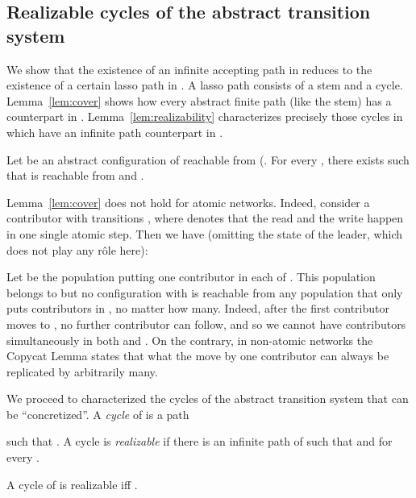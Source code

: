 \documentclass{llncs}
\begin{document}
\subsection{Realizable cycles of the abstract transition system} 
\label{subsec:realiz}
We show that the existence of an infinite accepting path in 
reduces to the existence of a certain lasso path in .  A
lasso path consists of a stem and a cycle.  
Lemma~\ref{lem:cover} shows
how every abstract finite path (like the stem) has a counterpart in .
Lemma~\ref{lem:realizability}
characterizes precisely those cycles in  which have an
infinite path counterpart in . 

\begin{lemma}
	Let  be an abstract configuration of  reachable from 
	 (.
	For every , there exists  such that
	 is reachable from 
	and .
	\label{lem:cover}
\end{lemma}
Lemma~\ref{lem:cover} does not hold for atomic networks. Indeed, consider a contributor
with transitions , where 
 denotes that the read and the write happen in one single atomic step.
Then we have (omitting the state of the leader, which does not play any r\^ole here):
{
\setlength\abovedisplayskip{1pt}
\setlength\belowdisplayskip{1pt}

}
\noindent 
Let  be the population putting one contributor in each of 
. This population belongs to 
but no configuration  with
 is reachable from any population that only puts 
contributors in , no matter how many. Indeed, after the first contributor
moves to , no further contributor can follow, and so we cannot have contributors
simultaneously in both  and . On the contrary, in non-atomic networks 
the Copycat Lemma states that what the move by one 
contributor can always be replicated by arbitrarily many.

We proceed to characterized the cycles of the abstract transition system that can be
``concretized''. A {\em cycle} of  is a path 

such that . A cycle is {\em realizable} if there is an
infinite path  of  such that 
 and  for every .

\begin{lemma}\label{lem:realizability}
A cycle  of 
 is realizable if{}f .
\end{lemma}
\end{document}
